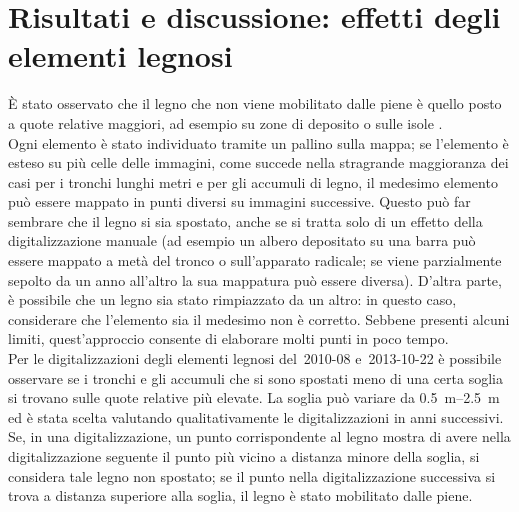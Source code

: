 \section{Risultati e discussione: effetti degli elementi legnosi}
È stato osservato che il legno che non viene mobilitato dalle piene è quello posto a quote relative maggiori, ad esempio su zone di deposito o sulle isole .
\\
Ogni elemento è stato individuato tramite un pallino sulla mappa; se l'elemento è esteso su più celle delle immagini, come succede nella stragrande maggioranza dei casi per i tronchi lunghi metri e per gli accumuli di legno, il medesimo elemento può essere mappato in punti diversi su immagini successive.
Questo può far sembrare che il legno si sia spostato, anche se si tratta solo di un effetto della digitalizzazione manuale (ad esempio un albero depositato su una barra può essere mappato a metà del tronco o sull'apparato radicale; se viene parzialmente sepolto da un anno all'altro la sua mappatura può essere diversa).
D'altra parte, è possibile che un legno sia stato rimpiazzato da un altro: in questo caso, considerare che l'elemento sia il medesimo non è corretto.
Sebbene presenti alcuni limiti, 	quest'approccio consente di elaborare molti punti in poco tempo.
\\
Per le digitalizzazioni degli elementi legnosi del~2010-08 e~2013-10-22 è possibile osservare se i tronchi e gli accumuli che si sono spostati meno di una certa soglia si trovano sulle quote relative più elevate.
La soglia può variare da \SIrange[range-phrase = { a }]{0.5}{2.5}{\m} ed è stata scelta valutando qualitativamente le digitalizzazioni in anni successivi.
Se, in una digitalizzazione, un punto corrispondente al legno mostra di avere nella digitalizzazione seguente il punto più vicino a distanza minore della soglia, si considera tale legno non spostato;
se il punto nella digitalizzazione successiva si trova a distanza superiore alla soglia, il legno è stato mobilitato dalle piene.

